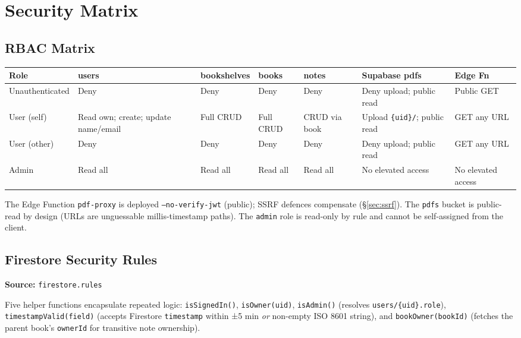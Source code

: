 \documentclass[11pt,a4paper]{article}
\begin{document}
\section{Security Matrix}

\subsection{RBAC Matrix}

\vspace{4pt}
\begin{tabularx}{\textwidth}{@{}L{2.5cm} C{1.65cm} C{1.65cm} C{1.65cm} C{1.65cm} C{2.0cm} C{2.05cm}@{}}
  \toprule
  \textbf{Role} & \textbf{users} & \textbf{book\-shelves} & \textbf{books} &
  \textbf{notes} & \textbf{Supabase pdfs} & \textbf{Edge Fn} \\
  \midrule
  Unauthenticated & Deny & Deny & Deny & Deny &
    Deny upload; public read & Public GET \\
  User (self) &
    Read own; create; update name/email &
    Full CRUD & Full CRUD & CRUD via book &
    Upload \texttt{\{uid\}/}; public read & GET any URL \\
  User (other) & Deny & Deny & Deny & Deny & Deny upload; public read & GET any URL \\
  Admin & Read all & Read all & Read all & Read all & No elevated access & No elevated access \\
  \bottomrule
\end{tabularx}
\vspace{2pt}

The Edge Function \texttt{pdf-proxy} is deployed \texttt{--no-verify-jwt} (public);
SSRF defences compensate (§\ref{sec:ssrf}). The \texttt{pdfs} bucket is
public-read by design (URLs are unguessable millis-timestamp paths). The
\texttt{admin} role is read-only by rule and cannot be self-assigned from the client.

\subsection{Firestore Security Rules}

\textbf{Source:} \texttt{firestore.rules}

Five helper functions encapsulate repeated logic: \texttt{isSignedIn()},
\texttt{isOwner(uid)}, \texttt{isAdmin()} (resolves \texttt{users/\{uid\}.role}),
\texttt{timestampValid(field)} (accepts Firestore \texttt{timestamp} within ±5 min
\emph{or} non-empty ISO 8601 string), and \texttt{bookOwner(bookId)} (fetches the
parent book's \texttt{ownerId} for transitive note ownership).
\end{document}
